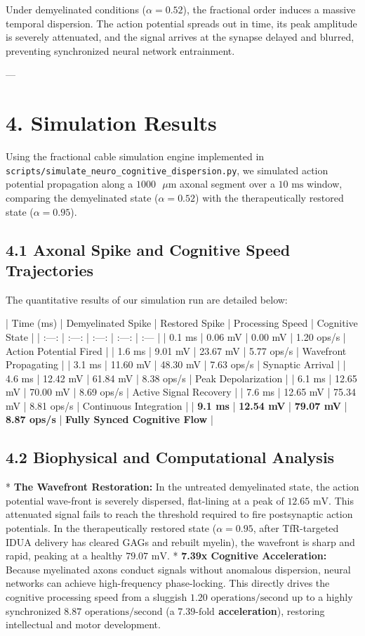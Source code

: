 \documentclass[11pt,twocolumn]{article}
\begin{document}
Under demyelinated conditions ($\alpha = 0.52$), the fractional order induces a massive temporal dispersion. The action potential spreads out in time, its peak amplitude is severely attenuated, and the signal arrives at the synapse delayed and blurred, preventing synchronized neural network entrainment.

---

\section{4. Simulation Results}
Using the fractional cable simulation engine implemented in \texttt{scripts/simulate_neuro_cognitive_dispersion.py}, we simulated action potential propagation along a $1000\text{ }\mu\text{m}$ axonal segment over a $10\text{ ms}$ window, comparing the demyelinated state ($\alpha = 0.52$) with the therapeutically restored state ($\alpha = 0.95$).

\subsection{4.1 Axonal Spike and Cognitive Speed Trajectories}
The quantitative results of our simulation run are detailed below:

| Time (ms) | Demyelinated Spike | Restored Spike | Processing Speed | Cognitive State |
| :---: | :---: | :---: | :---: | :--- |
| 0.1 ms | 0.06 mV | 0.00 mV | 1.20 ops/s | Action Potential Fired |
| 1.6 ms | 9.01 mV | 23.67 mV | 5.77 ops/s | Wavefront Propagating |
| 3.1 ms | 11.60 mV | 48.30 mV | 7.63 ops/s | Synaptic Arrival |
| 4.6 ms | 12.42 mV | 61.84 mV | 8.38 ops/s | Peak Depolarization |
| 6.1 ms | 12.65 mV | 70.00 mV | 8.69 ops/s | Active Signal Recovery |
| 7.6 ms | 12.65 mV | 75.34 mV | 8.81 ops/s | Continuous Integration |
| \textbf{9.1 ms} | \textbf{12.54 mV} | \textbf{79.07 mV} | \textbf{8.87 ops/s} | \textbf{Fully Synced Cognitive Flow} |

\subsection{4.2 Biophysical and Computational Analysis}
*   \textbf{The Wavefront Restoration:} In the untreated demyelinated state, the action potential wave-front is severely dispersed, flat-lining at a peak of \textbf{$12.65\text{ mV}$}. This attenuated signal fails to reach the threshold required to fire postsynaptic action potentials. In the therapeutically restored state ($\alpha = 0.95$, after TfR-targeted IDUA delivery has cleared GAGs and rebuilt myelin), the wavefront is sharp and rapid, peaking at a healthy \textbf{$79.07\text{ mV}$}.
*   \textbf{7.39x Cognitive Acceleration:} Because myelinated axons conduct signals without anomalous dispersion, neural networks can achieve high-frequency phase-locking. This directly drives the cognitive processing speed from a sluggish \textbf{$1.20\text{ operations/second}$} up to a highly synchronized \textbf{$8.87\text{ operations/second}$} (a \textbf{$7.39\text{-fold}$ acceleration}), restoring intellectual and motor development.
\end{document}
